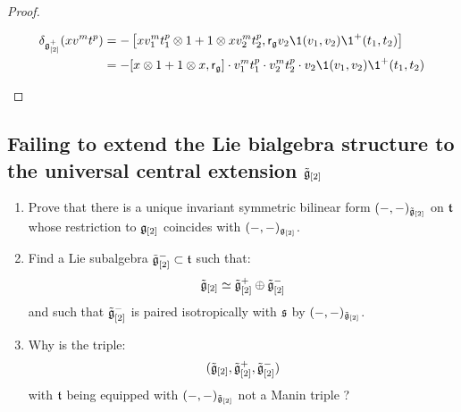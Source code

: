\begin{proof}
\begin{enumerate}
                        $$
                            \begin{aligned}
                                \delta_{\g_{[2]}^+}( x v^m t^p ) & = -\left[x v_1^m t_1^p \tensor 1 + 1 \tensor x v_2^m t_2^p, \sfr_{\g} v_2 \1(v_1, v_2) \1^+(t_1, t_2)\right]
                                \\
                                & = -[x \tensor 1 + 1 \tensor x, \sfr_{\g}] \cdot v_1^m t_1^p \cdot v_2^m t_2^p \cdot v_2 \1(v_1, v_2) \1^+(t_1, t_2)
                            \end{aligned}
                        $$
                \end{enumerate}
            \end{proof}

    \subsection{Failing to extend the Lie bialgebra structure to the universal central extension \texorpdfstring{$\tilde{\mathfrak{g}}_{[2]}$}{}}
        \begin{question} \label{question: extending_invariant_inner_products_on_multi_loop_to_universal_central_extensions}
            \begin{enumerate}
                \item Prove that there is a unique invariant symmetric bilinear form $(-, -)_{\tilde{\mathfrak{g}}_{[2]}}$ on $\mathfrak{t}$ whose restriction to $\mathfrak{g}_{[2]}$ coincides with $(-, -)_{\mathfrak{g}_{[2]}}$.
                \item Find a Lie subalgebra $\tilde{\mathfrak{g}}_{[2]}^- \subset \mathfrak{t}$ such that:
                    $$\tilde{\mathfrak{g}}_{[2]}\simeq \tilde{\mathfrak{g}}_{[2]}^+\oplus \tilde{\mathfrak{g}}_{[2]}^-$$
                and such that $\tilde{\mathfrak{g}}_{[2]}^-$ is paired isotropically with $\mathfrak{s}$ by $(-, -)_{\tilde{\mathfrak{g}}_{[2]}}$. 
                \item Why is the triple:
                    $$(\tilde{\mathfrak{g}}_{[2]}, \tilde{\mathfrak{g}}_{[2]}^+, \tilde{\mathfrak{g}}_{[2]}^-)$$
                with $\mathfrak{t}$ being equipped with $(-, -)_{\tilde{\mathfrak{g}}_{[2]}}$ not a Manin triple ?
            \end{enumerate}
        \end{question}
